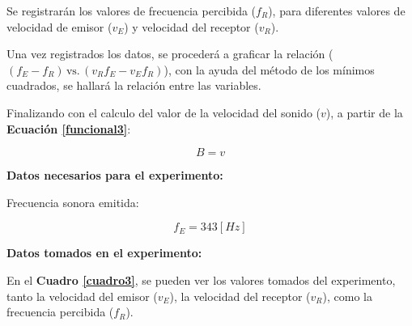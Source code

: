 \documentclass[letter,11pt]{article}
\begin{document}
Se registrarán los valores de frecuencia percibida ($f_R$), para diferentes
valores de velocidad de emisor ($v_E$) y velocidad del receptor ($v_R$).

Una vez registrados los datos, se procederá a graficar la relación 
($(f_E-f_R)\,\text{vs.}\,(v_R f_E - v_E f_R)$), con la ayuda del método de los
mínimos cuadrados, se hallará la relación entre las variables.

Finalizando con el calculo del valor de la velocidad del sonido ($v$), a partir
de la \textbf{Ecuación \ref{funcional3}}:

\begin{equation}
    B = v
\label{v3}
\end{equation}
\vspace{0.10cm}

\textbf{Datos necesarios para el experimento:}

Frecuencia sonora emitida:

\begin{equation*}
    f_E = 343 [Hz]
\end{equation*}
\vspace{0.10cm}

\textbf{Datos tomados en el experimento:}

En el \textbf{Cuadro \ref{cuadro3}}, se pueden ver los valores tomados del
experimento, tanto la velocidad del emisor ($v_E$), la velocidad del receptor
($v_R$), como la frecuencia percibida ($f_R$).
\end{document}

